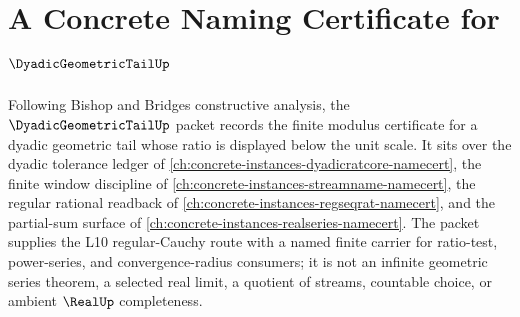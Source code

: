 \chapter{A Concrete Naming Certificate for $\DyadicGeometricTailUp$}
\label{ch:concrete-instances-dyadic-geometric-tail-namecert}

Following Bishop and Bridges constructive analysis, the $\DyadicGeometricTailUp$ packet records the finite modulus certificate for a dyadic geometric tail whose ratio is displayed below the unit scale. It sits over the dyadic tolerance ledger of \autoref{ch:concrete-instances-dyadicratcore-namecert}, the finite window discipline of \autoref{ch:concrete-instances-streamname-namecert}, the regular rational readback of \autoref{ch:concrete-instances-regseqrat-namecert}, and the partial-sum surface of \autoref{ch:concrete-instances-realseries-namecert}. The packet supplies the L10 regular-Cauchy route with a named finite carrier for ratio-test, power-series, and convergence-radius consumers; it is not an infinite geometric series theorem, a selected real limit, a quotient of streams, countable choice, or ambient $\RealUp$ completeness.

